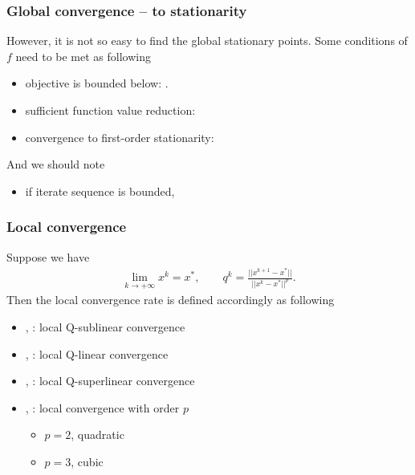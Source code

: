 	\subsubsection{Global convergence -- to stationarity}
However, it is not so easy to find the global stationary points. Some conditions of $f$ need to be met as following
	\begin{itemize}
		\item objective is bounded below: .
		\item sufficient function value reduction:
		\vspace{-6mm}
		
		\item convergence to first-order
		stationarity: 
		\end{itemize}
And we should note
		\begin{itemize}
		\item if iterate sequence is bounded, 
	\end{itemize}


	\subsubsection{Local convergence}
Suppose we have 
	\begin{eqnarray*}
		\lim\limits_{k\rightarrow +\infty} x^k=x^*,\qquad q^k = \frac{||x^{k+1}-x^*||}{||x^{k}-x^*||^p}.
	\end{eqnarray*}
Then the local convergence rate is defined accordingly as following	
	\begin{itemize}
		\item {}, :
		local Q-sublinear convergence
		\item {}, :
		local Q-linear convergence
		\item {}, :
		local Q-superlinear convergence
		\item {}, :
		local convergence with order $p$
		\begin{itemize}
			\item $p=2$, quadratic
			\item $p=3$, cubic
		\end{itemize}
	\end{itemize}
	\vspace{-5mm}
	


